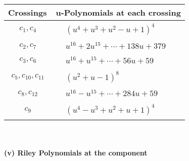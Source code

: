 \documentclass[1p]{elsarticle_modified}
\theoremstyle{definition}
\begin{document}
\begin{tabular}{m{50pt}|m{274pt}}
Crossings & \hspace{64pt}u-Polynomials at each crossing \\
\hline $$\begin{aligned}c_{1},c_{4}\end{aligned}$$&$\begin{aligned}
&(u^4+u^3+u^2- u+1)^4
\end{aligned}$\\
\hline $$\begin{aligned}c_{2},c_{7}\end{aligned}$$&$\begin{aligned}
&u^{16}+2 u^{15}+\cdots+138 u+379
\end{aligned}$\\
\hline $$\begin{aligned}c_{3},c_{6}\end{aligned}$$&$\begin{aligned}
&u^{16}+u^{15}+\cdots+56 u+59
\end{aligned}$\\
\hline $$\begin{aligned}c_{5},c_{10},c_{11}\end{aligned}$$&$\begin{aligned}
&(u^2+u-1)^8
\end{aligned}$\\
\hline $$\begin{aligned}c_{8},c_{12}\end{aligned}$$&$\begin{aligned}
&u^{16}- u^{15}+\cdots+284 u+59
\end{aligned}$\\
\hline $$\begin{aligned}c_{9}\end{aligned}$$&$\begin{aligned}
&(u^4- u^3+u^2+u+1)^4
\end{aligned}$\\
\hline
\end{tabular}\\~\\
\newpage\renewcommand{\arraystretch}{1}
\flushleft \textbf{(v) Riley Polynomials at the component}\newline \\
\end{document}
